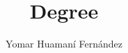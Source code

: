 \documentclass[12pt,a4paper,openany]{book}
\author{Yomar Huaman\'{i} Fern\'{a}ndez}
\title{Degree}
\begin{document}
	
	\frontmatter
		
		
		
		
		
		\tableofcontents
		\listoffigures
		\listoftables
	\mainmatter
	
			
		 
		
		 \cite{jhonson-2}
	\backmatter
	
	
\end{document}
